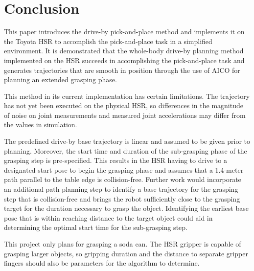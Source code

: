 \documentclass[11pt]{article}
\begin{document}

    \newpage     
    \section{Conclusion}
        This paper introduces the drive-by pick-and-place method and implements it on the Toyota HSR to accomplish the pick-and-place task in a simplified environment. It is demonstrated that the whole-body drive-by planning method implemented on the HSR succeeds in accomplishing the pick-and-place task and generates trajectories that are smooth in position through the use of AICO for planning an extended grasping phase.
        \par This method in its current implementation has certain limitations. The trajectory has not yet been executed on the physical HSR, so differences in the magnitude of noise on joint measurements and measured joint accelerations may differ from the values in simulation.

        \par The predefined drive-by base trajectory is linear and assumed to be given prior to planning. Moreover, the start time and duration of the sub-grasping phase of the grasping step is pre-specified. This results in the HSR having to drive to a designated start pose to begin the grasping phase and assumes that a 1.4-meter path parallel to the table edge is collision-free. Further work would incorporate an additional path planning step to identify a base trajectory for the grasping step that is collision-free and brings the robot sufficiently close to the grasping target for the duration necessary to grasp the object. Identifying the earliest base pose that is within reaching distance to the target object could aid in determining the optimal start time for the sub-grasping step.

        \par This project only plans for grasping a soda can. The HSR gripper is capable of grasping larger objects, so gripping duration and the distance to separate gripper fingers should also be parameters for the algorithm to determine.
\end{document}
